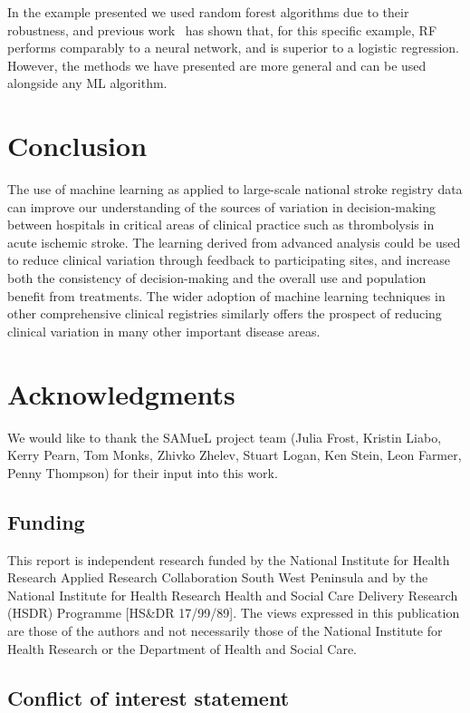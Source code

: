 \documentclass[12pt,a4paper, pdftex]{elsarticle}
\begin{document}
In the example presented we used random forest algorithms due to their robustness, and previous work~\cite{samuelbook} has shown that, for this specific example, RF performs comparably to a neural network, and is superior to a logistic regression. However, the methods we have presented are more general and can be used alongside any ML algorithm. 




\section{Conclusion}

The use of machine learning as applied to large-scale national stroke registry data can improve our understanding of the sources of variation in decision-making between hospitals in critical areas of clinical practice such as thrombolysis in acute ischemic stroke. The learning derived from advanced analysis could be used to reduce clinical variation through feedback to participating sites, and increase both the consistency of decision-making and the overall use and population benefit from treatments. The wider adoption of machine learning techniques in other comprehensive clinical registries similarly offers the prospect of reducing clinical variation in many other important disease areas.

\section*{Acknowledgments}

We would like to thank the SAMueL project team (Julia Frost, Kristin Liabo, Kerry Pearn, Tom Monks, Zhivko Zhelev, Stuart Logan, Ken Stein, Leon Farmer, Penny Thompson) for their input into this work.

\subsection*{Funding}

This report is independent research funded by the National Institute for Health Research Applied Research Collaboration South West Peninsula and by the National Institute for Health Research Health and Social Care Delivery Research (HSDR) Programme [HS\&DR 17/99/89]. The views expressed in this publication are those of the authors and not necessarily those of the National Institute for Health Research or the Department of Health and Social Care.

\subsection*{Conflict of interest statement}
\end{document}
